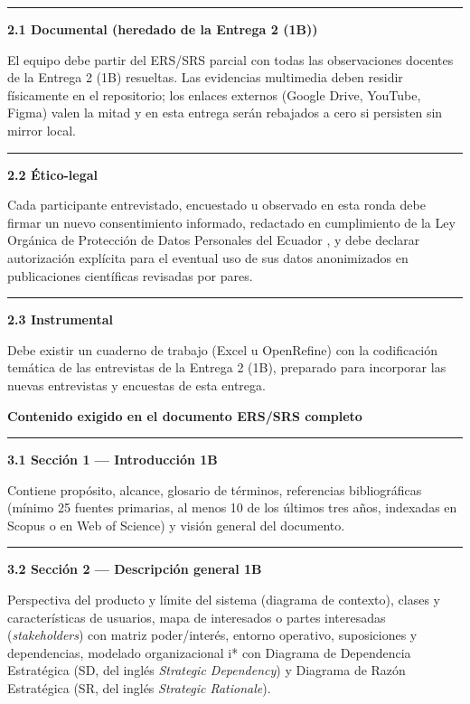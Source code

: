 \documentclass[11pt,a4paper]{article}
\newcounter{secc}
\newcommand{\secband}[1]{%
    \stepcounter{secc}\par\vspace{9pt}\noindent
    {\setlength{\fboxsep}{0pt}%
        \colorbox{uteqgold}{\parbox[c][20pt][c]{0.05\textwidth}{\centering\textbf{\color{white}\small \arabic{secc}}}}%
        \colorbox{uteqgreen}{\parbox[c][20pt][c]{0.95\textwidth}{\hspace{8pt}\textbf{\color{white}\small #1}}}%
    }\par\vspace{5pt}}
\newcommand{\submark}[1]{\par\vspace{4pt}\noindent
    {\color{uteqgreen}\rule[-1pt]{3.5pt}{12pt}}\hspace{6pt}\textbf{\color{uteqgreen}#1}\par\vspace{2pt}}
\newcommand{\bB}{{\setlength{\fboxsep}{1.5pt}\colorbox{uteqgold}{\scriptsize\bfseries\color{white}1B}}}
\begin{document}
\submark{2.1 Documental (heredado de la Entrega 2 (1B))}
El equipo debe partir del ERS/SRS parcial con todas las observaciones docentes de la Entrega 2 (1B) resueltas.
Las evidencias multimedia deben residir físicamente en el repositorio; los enlaces externos (Google Drive, YouTube, Figma) valen la mitad y en esta entrega serán rebajados a cero si persisten sin mirror local.

\submark{2.2 Ético-legal}
Cada participante entrevistado, encuestado u observado en esta ronda debe firmar un nuevo consentimiento informado, redactado en cumplimiento de la Ley Orgánica de Protección de Datos Personales del Ecuador \cite{ley_datos_ecuador_2021}, y debe declarar autorización explícita para el eventual uso de sus datos anonimizados en publicaciones científicas revisadas por pares.

\submark{2.3 Instrumental}
Debe existir un cuaderno de trabajo (Excel u OpenRefine) con la codificación temática de las entrevistas de la Entrega 2 (1B), preparado para incorporar las nuevas entrevistas y encuestas de esta entrega.

\secband{Contenido exigido en el documento ERS/SRS completo}

\submark{3.1 Sección 1 --- Introducción \bB}
Contiene propósito, alcance, glosario de términos, referencias bibliográficas (mínimo 25 fuentes primarias, al menos 10 de los últimos tres años, indexadas en Scopus o en Web of Science) y visión general del documento.

\submark{3.2 Sección 2 --- Descripción general \bB}
Perspectiva del producto y límite del sistema (diagrama de contexto), clases y características de usuarios, mapa de interesados o partes interesadas (\emph{stakeholders}) con matriz poder/interés, entorno operativo, suposiciones y dependencias, modelado organizacional i* con Diagrama de Dependencia Estratégica (SD, del inglés \emph{Strategic Dependency}) y Diagrama de Razón Estratégica (SR, del inglés \emph{Strategic Rationale}).
\end{document}
